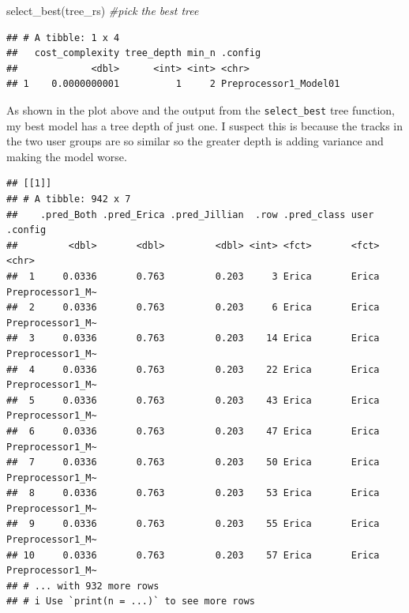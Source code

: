 \documentclass[
]{article}
\newenvironment{Shaded}{\begin{snugshade}}{\end{snugshade}}
\newcommand{\CommentTok}[1]{\textcolor[rgb]{0.56,0.35,0.01}{\textit{#1}}}
\newcommand{\FunctionTok}[1]{\textcolor[rgb]{0.00,0.00,0.00}{#1}}
\newcommand{\NormalTok}[1]{#1}
\newcommand{\OtherTok}[1]{\textcolor[rgb]{0.56,0.35,0.01}{#1}}
\newcommand{\SpecialCharTok}[1]{\textcolor[rgb]{0.00,0.00,0.00}{#1}}
\begin{document}
\begin{Shaded}
\begin{Highlighting}[]
\FunctionTok{select\_best}\NormalTok{(tree\_rs) }\CommentTok{\#pick the best tree}
\end{Highlighting}
\end{Shaded}

\begin{verbatim}
## # A tibble: 1 x 4
##   cost_complexity tree_depth min_n .config              
##             <dbl>      <int> <int> <chr>                
## 1    0.0000000001          1     2 Preprocessor1_Model01
\end{verbatim}

As shown in the plot above and the output from the \texttt{select\_best}
tree function, my best model has a tree depth of just one. I suspect
this is because the tracks in the two user groups are so similar so the
greater depth is adding variance and making the model worse.

\begin{Shaded}
\end{Shaded}

\begin{verbatim}
## [[1]]
## # A tibble: 942 x 7
##    .pred_Both .pred_Erica .pred_Jillian  .row .pred_class user  .config         
##         <dbl>       <dbl>         <dbl> <int> <fct>       <fct> <chr>           
##  1     0.0336       0.763         0.203     3 Erica       Erica Preprocessor1_M~
##  2     0.0336       0.763         0.203     6 Erica       Erica Preprocessor1_M~
##  3     0.0336       0.763         0.203    14 Erica       Erica Preprocessor1_M~
##  4     0.0336       0.763         0.203    22 Erica       Erica Preprocessor1_M~
##  5     0.0336       0.763         0.203    43 Erica       Erica Preprocessor1_M~
##  6     0.0336       0.763         0.203    47 Erica       Erica Preprocessor1_M~
##  7     0.0336       0.763         0.203    50 Erica       Erica Preprocessor1_M~
##  8     0.0336       0.763         0.203    53 Erica       Erica Preprocessor1_M~
##  9     0.0336       0.763         0.203    55 Erica       Erica Preprocessor1_M~
## 10     0.0336       0.763         0.203    57 Erica       Erica Preprocessor1_M~
## # ... with 932 more rows
## # i Use `print(n = ...)` to see more rows
\end{verbatim}
\end{document}
